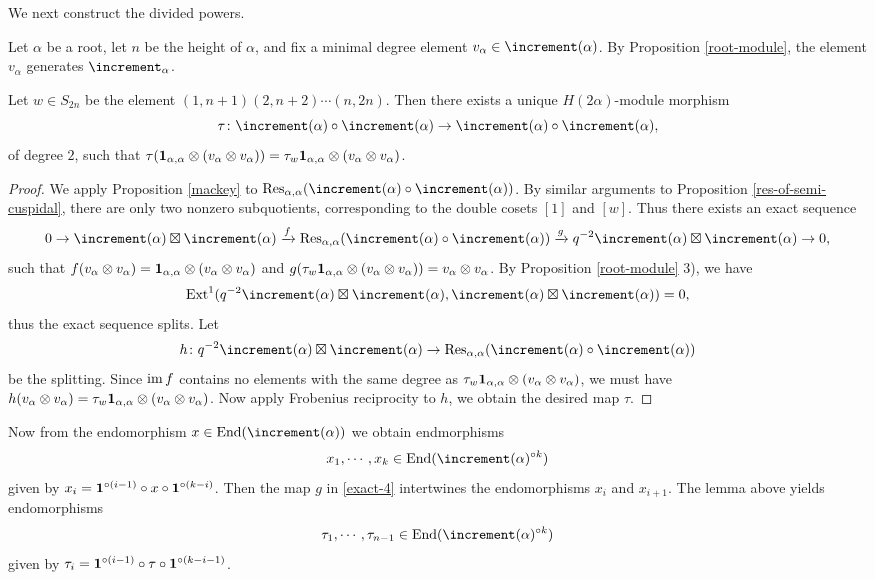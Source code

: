 We next construct the divided powers.

Let $\alpha$ be a root, let $n$ be the height of $\alpha$, and fix a minimal degree
element $v_\alpha\in\std(\alpha)$. By Proposition \ref{root-module},
the element $v_\alpha$ generates $\std_\alpha$.

\begin{lemma}\label{definition-of-tau}
    Let $w\in S_{2n}$ be the element $(1,n+1)(2,n+2)\cdots(n,2n)$.
    Then there exists a unique $H(2\alpha)$-module morphism
    \[
        \tau\:\std(\alpha)\circ\std(\alpha)
        \to\std(\alpha)\circ\std(\alpha),
    \]
    of degree $2$, such that $\tau(\mathbf{1}_{\alpha,\alpha}\otimes
    (v_\alpha\otimes v_\alpha)) = \tau_w\mathbf{1}_{\alpha,\alpha}\otimes
    (v_\alpha\otimes v_\alpha)$.
\end{lemma}

\begin{proof}
    We apply Proposition \ref{mackey} to 
    $\Res_{\alpha,\alpha}(\std(\alpha)\circ\std(\alpha))$. By similar arguments
    to Proposition \ref{res-of-semi-cuspidal}, there are only two
    nonzero subquotients, corresponding to the double cosets
    $[1]$ and $[w]$. Thus there exists an exact sequence
    \begin{equation}\label{exact-4}
        0\to\std(\alpha)\ex\std(\alpha)\xrightarrow{f}
        \Res_{\alpha,\alpha}(\std(\alpha)\circ\std(\alpha))
        \xrightarrow{g}q^{-2}\std(\alpha)\ex\std(\alpha)\to0,
    \end{equation}
    such that $f(v_\alpha\otimes v_\alpha) = \mathbf{1}_{\alpha,\alpha}
    \otimes(v_\alpha\otimes v_\alpha)$ and $g(\tau_w\mathbf{1}_{\alpha,\alpha}
    \otimes(v_\alpha\otimes v_\alpha)) = v_\alpha\otimes v_\alpha$.
    By Proposition \ref{root-module} 3), we have 
    \[
        \Ext^1(q^{-2}\std(\alpha)\ex\std(\alpha),
        \std(\alpha)\ex\std(\alpha)) = 0,
    \] 
    thus the exact
    sequence splits. Let 
    \[
        h\:q^{-2}\std(\alpha)\ex\std(\alpha)
        \to\Res_{\alpha,\alpha}(\std(\alpha)\circ\std(\alpha))
    \]
    be the splitting. Since $\operatorname{im} f$ contains no elements with
    the same degree as $\tau_w\mathbf{1}_{\alpha,\alpha}
    \otimes(v_\alpha\otimes v_\alpha)$, we must have $h(v_\alpha\otimes v_\alpha)
     = \tau_w\mathbf{1}_{\alpha,\alpha}\otimes(v_\alpha\otimes v_\alpha)$.
    Now apply Frobenius reciprocity to $h$, we obtain the
    desired map $\tau$.
\end{proof}

Now from the endomorphism $x\in\End(\std(\alpha))$
we obtain endmorphisms 
\[
    x_1,\cdots,x_k\in\End(\std(\alpha)^{\circ k})
\]
given by $x_i = \mathbf{1}^{\circ(i-1)}\circ x\circ\mathbf{1}^{\circ(k-i)}$.
Then the map $g$ in \ref{exact-4} intertwines the endomorphisms
$x_i$ and $x_{i+1}$. The lemma above yields endomorphisms
\[
    \tau_1,\cdots,\tau_{n-1}\in\End(\std(\alpha)^{\circ k})
\]
given by $\tau_i = \mathbf{1}^{\circ(i-1)}\circ\tau\circ\mathbf{1}^{\circ(k-i-1)}$.


